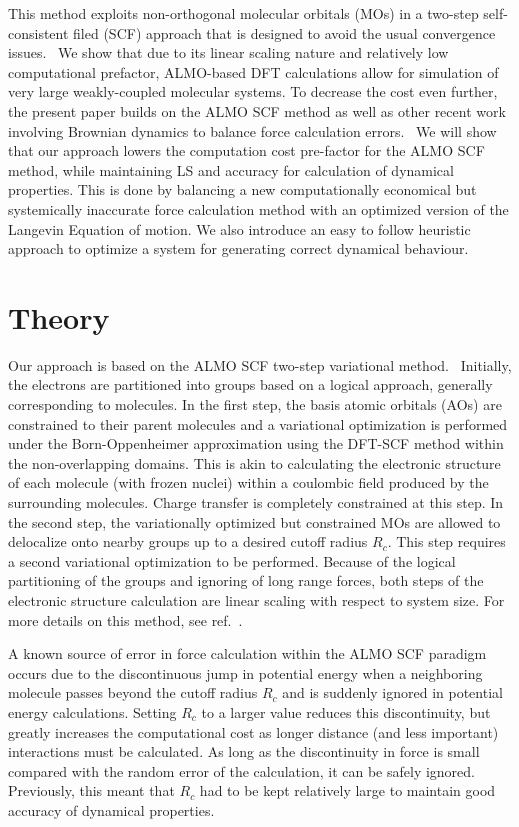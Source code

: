 \documentclass[10pt,aps,prl,twocolumn,amsmath,amssymb,superscriptaddress,longbibliography]{revtex4-1}
\begin{document}
This method exploits non-orthogonal molecular orbitals (MOs) in a two-step self-consistent filed (SCF) approach that is designed to avoid the usual convergence issues.~\cite{a:ls-mauri-galli-car-1993,a:ls-ordejon-1995,a:ls-fattebert-2004,a:ls-rev-1999} 
We show that due to its linear scaling nature and relatively low computational prefactor, ALMO-based DFT calculations allow for simulation of very large weakly-coupled molecular systems. 
To decrease the cost even further, the present paper builds on the ALMO SCF method as well as other recent work involving Brownian dynamics to balance force calculation errors.~\cite{a:ls-parinello,a:2ndcpmd,a:langevin-why} 
We will show that our approach lowers the computation cost pre-factor for the ALMO SCF method, while maintaining LS and accuracy for calculation of dynamical properties. 
This is done by balancing a new computationally economical but systemically inaccurate force calculation method with an optimized version of the Langevin Equation of motion. 
We also introduce an easy to follow heuristic approach to optimize a system for generating correct dynamical behaviour.

\section{Theory} 

Our approach is based on the ALMO SCF two-step variational method.~\cite{a:almo-ls} 
Initially, the electrons are partitioned into groups based on a logical approach, generally corresponding to molecules. 
In the first step, the basis atomic orbitals (AOs) are constrained to their parent molecules and a variational optimization is performed under the Born-Oppenheimer approximation using the DFT-SCF method within the non-overlapping domains. 
This is akin to calculating the electronic structure of each molecule (with frozen nuclei) within a coulombic field produced by the surrounding molecules. 
Charge transfer is completely constrained at this step. 
In the second step, the variationally optimized but constrained MOs are allowed to delocalize onto nearby groups up to a desired cutoff radius $R_{c}$. 
This step requires a second variational optimization to be performed. 
Because of the logical partitioning of the groups and ignoring of long range forces, both steps of the electronic structure calculation are linear scaling with respect to system size. 
For more details on this method, see ref.\ .

A known source of error in force calculation within the ALMO SCF paradigm occurs due to the discontinuous jump in potential energy when a neighboring molecule passes beyond the cutoff radius $R_{c}$ and is suddenly ignored in potential energy calculations. 
Setting $R_{c}$ to a larger value reduces this discontinuity, but greatly increases the computational cost as longer distance (and less important) interactions must be calculated. 
As long as the discontinuity in force is small compared with the random error of the calculation, it can be safely ignored. Previously, this meant that $R_{c}$ had to be kept relatively large to maintain good accuracy of dynamical properties.
\end{document}

